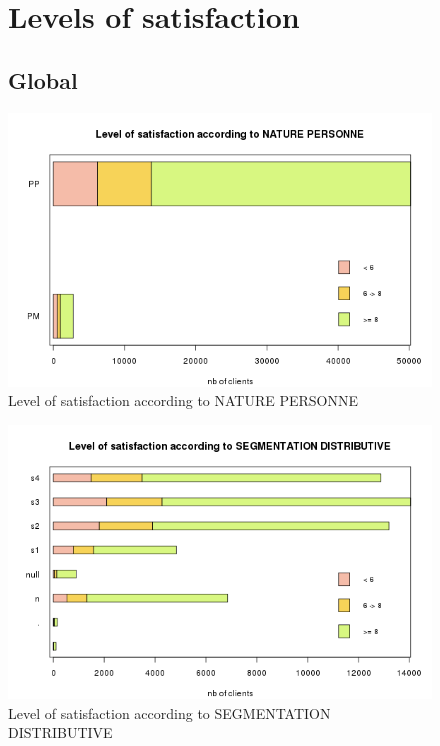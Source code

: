 \documentclass[a4paper, 11pt]{article}
\begin{document}
\newpage
\appendix
    \begin{figure}[!ht]
    \section{Levels of satisfaction}
    \label{app:satisfaction}
    	\subsection{Global}
    	\centering
            \includegraphics[width = 10 cm]{Remi/Level_of_satisfaction_according_to_NATURE_PERSONNE.png}
            \caption{Level of satisfaction according to NATURE PERSONNE}
            \label{fig:NATURE_PERSONNE}
    \end{figure}
    
    \begin{figure}[!ht]
    	\centering
            \includegraphics[height = 10 cm]{Remi/Level_of_satisfaction_according_to_SEGMENTATION_DISTRIBUTIVE.png}
            \caption{Level of satisfaction according to SEGMENTATION DISTRIBUTIVE}
            \label{fig:SEGMENTATION_DISTRIBUTIVE}
    \end{figure}
    
\end{document}
